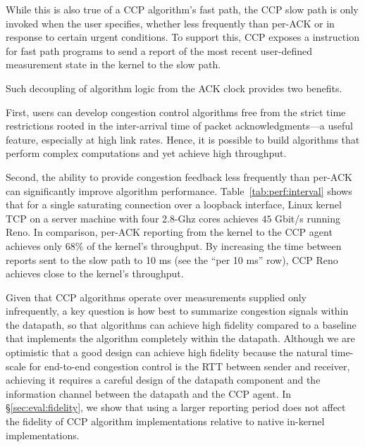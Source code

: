 While this is also true of a CCP algorithm's fast path, the CCP slow path is
only invoked when the user specifies, whether less frequently than per-ACK or in response to certain urgent conditions.
%
To support this, CCP exposes a  instruction for fast path programs to send a
report of the most recent user-defined measurement state in the kernel to the slow path.
\fi

Such decoupling of algorithm logic from the ACK clock provides two benefits.

First, users can develop congestion control algorithms free from the strict
time restrictions rooted in the inter-arrival time of packet acknowledgments---a useful feature, especially at high link rates.
Hence, it is possible to build algorithms that perform complex computations and yet achieve high throughput.

Second, the ability to provide congestion feedback less frequently than per-ACK can significantly improve algorithm performance.
%
Table~\ref{tab:perf:interval} shows that for a single saturating 
connection over a loopback interface, Linux kernel TCP on a server machine
with four 2.8-Ghz cores achieves $45$ Gbit/s running Reno.
%
In comparison, per-ACK reporting from the kernel to the CCP agent achieves
only 68\% of the kernel's throughput.
%
By increasing the time between reports sent to the slow path to 10 ms (see the
``per 10 ms'' row), CCP Reno achieves close to the kernel's throughput.

Given that CCP algorithms operate over measurements supplied only infrequently, a key question is
how best to summarize congestion signals within the datapath, so that algorithms can achieve high fidelity compared to a baseline that implements the
algorithm completely within the datapath.
Although we are optimistic that a good design can achieve high fidelity because the natural time-scale for end-to-end
congestion control is the RTT between sender and receiver,
achieving it requires a careful design of the datapath component and the information channel between the datapath and the CCP agent.
In \S\ref{sec:eval:fidelity}, we show that using a
larger reporting period does not affect the fidelity of CCP algorithm
implementations relative to native in-kernel implementations.

